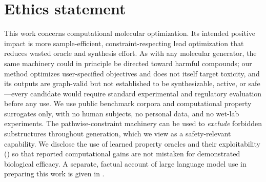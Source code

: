 \section*{Ethics statement}
\label{sec:ethics}
This work concerns computational molecular optimization. Its intended positive impact is more
sample-efficient, constraint-respecting lead optimization that reduces wasted oracle and synthesis
effort. As with any molecular generator, the same machinery could in principle be directed toward
harmful compounds; our method optimizes user-specified objectives and does not itself target toxicity,
and its outputs are graph-valid but not established to be synthesizable, active, or safe---every
candidate would require standard experimental and regulatory evaluation before any use. We use public
benchmark corpora and computational property surrogates only, with no human subjects, no personal data,
and no wet-lab experiments. The pathwise-constraint machinery can be used to \emph{exclude} forbidden
substructures throughout generation, which we view as a safety-relevant capability. We disclose the use
of learned property oracles and their exploitability () so that reported
computational gains are not mistaken for demonstrated biological efficacy. A separate, factual account
of large language model use in preparing this work is given in .
